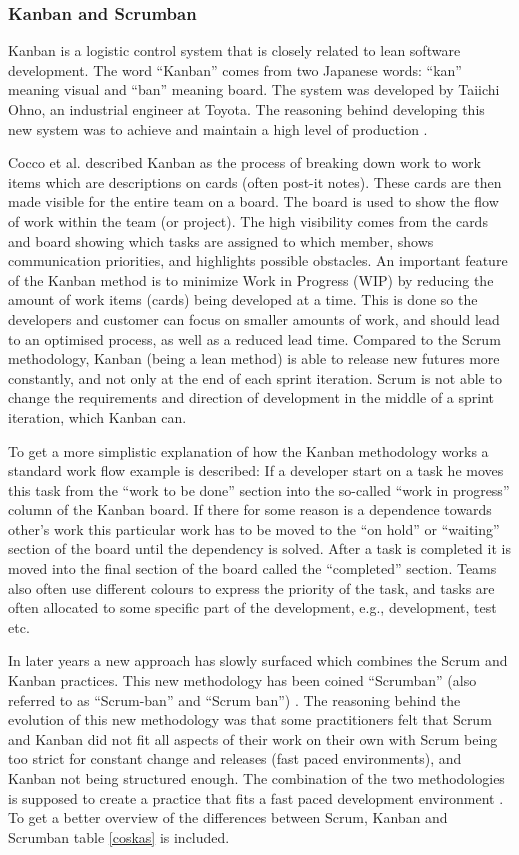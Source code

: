 \subsubsection{Kanban and Scrumban}

Kanban is a logistic control system that is closely related to lean software development. The word ``Kanban'' comes from two Japanese words: ``kan'' meaning visual and ``ban'' meaning board. The system was developed by Taiichi Ohno, an industrial engineer at Toyota. The reasoning behind developing this new system was to achieve and maintain a high level of production \cite{anderson2010kanban}.

Cocco et al. \cite{Cocco2011} described Kanban as the process of breaking down work to work items which are descriptions on cards (often post-it notes). These cards are then made visible for the entire team on a board. The board is used to show the flow of work within the team (or project). The high visibility comes from the cards and board showing which tasks are assigned to which member, shows communication priorities, and highlights possible obstacles. An important feature of the Kanban method is to minimize Work in Progress (WIP) by reducing the amount of work items (cards) being developed at a time. This is done so the developers and customer can focus on smaller amounts of work, and should lead to an optimised process, as well as a reduced lead time. Compared to the Scrum methodology, Kanban (being a lean method) is able to release new futures more constantly, and not only at the end of each sprint iteration. Scrum is not able to change the requirements and direction of development in the middle of a sprint iteration, which Kanban can.

To get a more simplistic explanation of how the Kanban methodology works a standard work flow example is described: If a developer start on a task he moves this task from the ``work to be done'' section into the so-called ``work in progress'' column of the Kanban board. If there for some reason is a dependence towards other's work this particular work has to be moved to the ``on hold'' or ``waiting'' section of the board until the dependency is solved. After a task is completed it is moved into the final section of the board called the ``completed'' section. Teams also often use different colours to express the priority of the task, and tasks are often allocated to some specific part of the development, e.g., development, test etc. 

In later years a new approach has slowly surfaced which combines the Scrum and Kanban practices. This new methodology has been coined ``Scrumban'' (also referred to as ``Scrum-ban'' and ``Scrum ban'') \cite{Scrumban2008}. The reasoning behind the evolution of this new methodology was that some practitioners felt that Scrum and Kanban did not fit all aspects of their work on their own with Scrum being too strict for constant change and releases (fast paced environments), and Kanban not being structured enough. The combination of the two methodologies is supposed to create a practice that fits a fast paced development environment \cite{Scrumban2015}. To get a better overview of the differences between Scrum, Kanban and Scrumban table \ref{coskas} is included.

